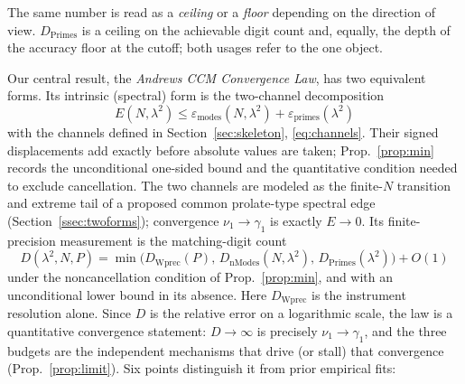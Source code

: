 \documentclass[11pt,a4paper]{article}
\begin{document}
\noindent The same number is read as a \emph{ceiling} or a
\emph{floor} depending on the direction of view. $D_{\mathrm{Primes}}$ is a
ceiling on the achievable digit count and, equally, the depth of the accuracy
floor at the cutoff; both usages refer to the one object.

\noindent Our central result, the \emph{Andrews CCM Convergence Law}, has two
equivalent forms. Its intrinsic (spectral) form is the two-channel decomposition
\begin{equation}\label{eq:main-intrinsic}
  \boxed{\;E(N,\lambda^2)\le\varepsilon_{\mathrm{modes}}(N,\lambda^2)
         +\varepsilon_{\mathrm{primes}}(\lambda^2)\;}
\end{equation}
with the channels defined in Section~\ref{sec:skeleton},
\eqref{eq:channels}. Their signed displacements add exactly before absolute
values are taken; Prop.~\ref{prop:min} records the unconditional one-sided
bound and the quantitative condition needed to exclude cancellation. The two
channels are modeled as the
finite-$N$ transition and extreme tail of a proposed common prolate-type
spectral edge (Section~\ref{ssec:twoforms}); convergence
$\nu_1\to\gamma_1$ is exactly $E\to0$. Its finite-precision measurement is the
matching-digit count
\begin{equation}\label{eq:main}
  \boxed{\;D(\lambda^2,N,P)=\min\!\bigl(D_{\mathrm{Wprec}}(P),\,
  D_{\mathrm{nModes}}(N,\lambda^2),\,D_{\mathrm{Primes}}(\lambda^2)\bigr)+O(1)\;}
\end{equation}
under the noncancellation condition of Prop.~\ref{prop:min}, and with an
unconditional lower bound in its absence. Here $D_{\mathrm{Wprec}}$ is the
instrument resolution alone. Since $D$ is the
relative error on a logarithmic scale, the law is a quantitative convergence
statement: $D\to\infty$ is precisely $\nu_1\to\gamma_1$, and the three budgets
are the independent mechanisms that drive (or stall) that convergence
(Prop.~\ref{prop:limit}). Six points
distinguish it from prior empirical fits:
\end{document}
